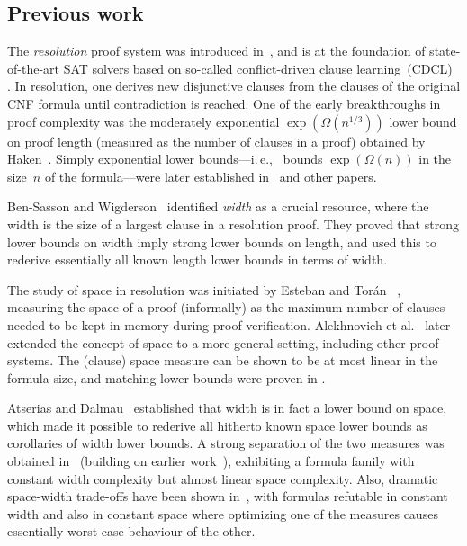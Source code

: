 \documentclass[11pt]{article}
\makeatletter
\numberwithin{equation}{section}
\theoremstyle{definition}
\theoremstyle{plain}
\newcommand{\ie}{i.\,e.}
\theoremstyle{plain}
\theoremstyle{definition}
\newcommand{\bigomega}[1]{\Omega ( #1 )}
\newcommand{\introduceterm}[1]{{\emph{#1}}}
\newcommand{\ieComma}{\ie,\ }
\newcommand{\etal}{et al.\@\xspace}
\newcommand{\mysubsection}[1]{\subsection{#1}}
\makeatother
\begin{document}
\mysubsection{Previous work}

The \introduceterm{resolution} proof system was introduced
in~\cite{Blake37Thesis}, and is at the foundation
of state-of-the-art SAT solvers based on so-called conflict-driven
clause learning~(CDCL)~%
\cite{BS97UsingCSP,MS99Grasp,MMZZM01Engineering}.
%
In resolution, one derives new disjunctive clauses 
from the clauses of the original CNF formula until 
contradiction is reached.
One of the early breakthroughs in proof complexity was the
%
%
%
moderately exponential %
%
%
%
%
%
%
$\exp(\bigomega{n^{1/3}})$   %
lower bound on proof length 
(measured as the number of clauses in a proof)
obtained by Haken~\cite{Haken85Intractability}.
%
Simply   %
exponential lower bounds---\ieComma
bounds $\exp(\bigomega{n})$
in the size~$n$ of the formula---were 
later  established in~%
\cite{CS88ManyHard,Urquhart87HardExamples}
and other papers.


Ben-Sasson and Wigderson~\cite{BW01ShortProofs}
identified \introduceterm{width}
as a crucial resource, where the width is the
size of a largest clause in a resolution proof.
They proved that strong lower bounds on width imply strong lower
bounds on length, and used this to rederive essentially all known
length lower bounds in terms of width.

The study of space in resolution was initiated by Esteban and Tor\'an~%
\cite{ET01SpaceBounds}, measuring the space of a proof (informally) as
the maximum number of clauses needed to be kept in memory during proof
verification. Alekhnovich \etal~\cite{ABRW02SpaceComplexity}
later extended the concept of space to a more general setting,
including other proof systems.
The (clause) space measure can be shown to be at most linear in the
formula size, and matching lower bounds were proven in
\cite{ABRW02SpaceComplexity,
  BG03SpaceComplexity,
  ET01SpaceBounds}.

Atserias and Dalmau~%
\cite{AD08CombinatoricalCharacterization}
established that %
width
is in fact
%
%
%
a lower bound on space, %
which made it possible
to rederive all hitherto known space lower bounds as corollaries of
width lower bounds.
%
A strong separation of the two measures
%
was obtained in~%
\cite{BN08ShortProofs}
(building on earlier 
work~\cite{Nordstrom09NarrowProofsSICOMP,NH13TowardsOptimalSeparation}),
exhibiting a formula family
with constant width complexity but almost
linear space complexity. 
%
Also, dramatic space-width trade-offs have been shown
in~\cite{Ben-Sasson09SizeSpaceTradeoffs}, 
with formulas refutable in constant width and
also in  %
constant space
%
where optimizing one of the
measures causes essentially worst-case behaviour of the 
other.
%
\end{document}
